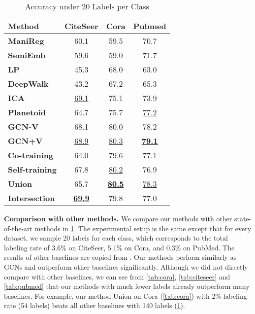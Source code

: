 \documentclass[letterpaper]{article} \usepackage{aaai18}  \usepackage{times}  \usepackage{helvet}  \usepackage{courier}  \usepackage{url}  \usepackage{graphicx}  \usepackage{algorithm}
\begin{document}
\begin{table}[t]
    \caption{Accuracy under 20 Labels per Class}\label{tab:gcn_baseline}
    \centering
    \begin{tabular}{l ccc}
    \textbf{Method} & \textbf{CiteSeer} & \textbf{Cora} & \textbf{Pubmed} \\
    \midrule
    \textbf{ManiReg}   & 60.1 & 59.5 & 70.7 \\
    \textbf{SemiEmb}   & 59.6 & 59.0 & 71.7 \\
    \textbf{LP}        & 45.3 & 68.0 & 63.0 \\
    \textbf{DeepWalk}  & 43.2 & 67.2 & 65.3 \\
    \textbf{ICA}       & \underline{69.1} & 75.1 & 73.9 \\
    \textbf{Planetoid} & 64.7 & 75.7 & \underline{77.2} \\
    \textbf{GCN-V}     & 68.1 & 80.0 & 78.2 \\
    \textbf{GCN+V}     & \underline{68.9} & \underline{80.3} & \underline{\textbf{79.1}} \\
    \midrule
    \textbf{Co-training}    & 64.0 & 79.6 & 77.1 \\
    \textbf{Self-training}  & 67.8 & \underline{80.2} & 76.9 \\
    \textbf{Union}          & 65.7 & \underline{\textbf{80.5}} & \underline{78.3} \\
    \textbf{Intersection}   & \underline{\textbf{69.9}} & 79.8 & 77.0 \\

    \end{tabular}
\end{table}













\textbf{Comparison with other methods.} We compare our methods with other state-of-the-art methods in \tablename\;\ref{tab:gcn_baseline}. The experimental setup is the same except that for every dataset, we sample 20 labels for each class, which corresponds to the total labeling rate of 3.6\% on CiteSeer, 5.1\% on Cora, and 0.3\% on PubMed. The results of other baselines are copied from \cite{kipf2016semi}. Our methods perform similarly as GCNs and outperform other baselines significantly. Although we did not directly compare with other baselines, we can see from \tablename\;\ref{tab:cora}, \ref{tab:citeseer} and \ref{tab:pubmed} that our methods with much fewer labels already outperform many baselines. For example, our method Union on Cora (\tablename\;\ref{tab:cora}) with 2\% labeling rate (54 labels) beats all other baselines with 140 labels (\tablename\;\ref{tab:gcn_baseline}).
\end{document}
